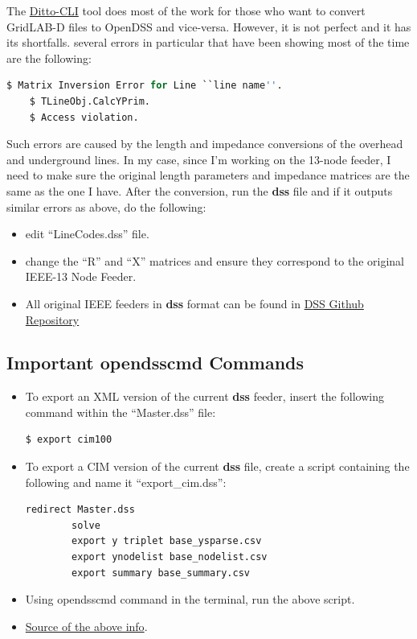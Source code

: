 The \href{https://github.com/NREL/ditto}{Ditto-CLI} tool does most of the work for those who want to convert GridLAB-D files to OpenDSS and vice-versa. However, it is not perfect and it has its 
shortfalls. several errors in particular that have been showing most of the time are the following:
\begin{lstlisting}[language=python]
    $ Matrix Inversion Error for Line ``line name''.
    $ TLineObj.CalcYPrim.
    $ Access violation.
\end{lstlisting}
Such errors are caused by the length and impedance conversions of the overhead and underground lines. In my case, since I'm working on the 13-node feeder, I need to make sure the original length
parameters and impedance matrices are the same as the one I have. After the conversion, run the \textbf{dss} file and if it outputs similar errors as above, do the following:
\begin{itemize}
    \item edit ``LineCodes.dss'' file.
    \item change the ``R'' and ``X'' matrices and ensure they correspond to the original IEEE-13 Node Feeder.
    \item All original IEEE feeders in \textbf{dss} format can be found in \href{https://github.com/tshort/OpenDSS/tree/master/Distrib/IEEETestCases}{DSS Github Repository}
\end{itemize}

\subsection{Important opendsscmd Commands}
\begin{itemize}
    \item To export an XML version of the current \textbf{dss} feeder, insert the following command within the ``Master.dss'' file:
    \begin{lstlisting}[language=python]
        $ export cim100
    \end{lstlisting}
    \item To export a CIM version of the current \textbf{dss} file, create a script containing the following and name it ``export\_cim.dss'':
    \begin{lstlisting}[language=python]
        redirect Master.dss
        solve
        export y triplet base_ysparse.csv
        export ynodelist base_nodelist.csv
        export summary base_summary.csv
    \end{lstlisting}
    \item Using opendsscmd command in the terminal, run the above script.
    \item \href{https://sourceforge.net/projects/electricdss/files/OpenDSSCmd/}{Source of the above info}.
\end{itemize}
